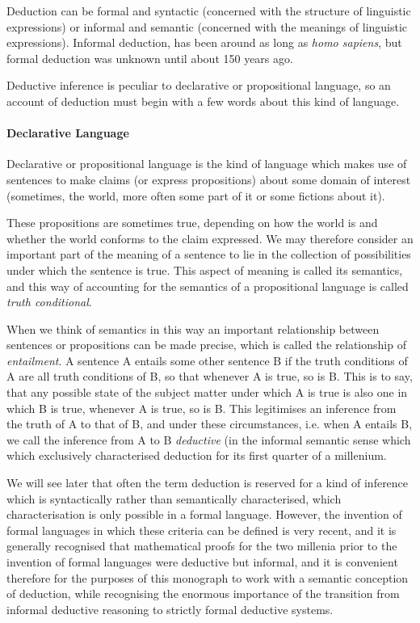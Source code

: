 \documentclass[10pt,titlepage]{book}
\begin{document}
Deduction can be formal and syntactic (concerned with the structure of linguistic expressions)  or informal and semantic (concerned with the meanings of linguistic expressions).
Informal deduction, has been around as long as \emph{homo sapiens}, but formal deduction was unknown until about 150 years ago.

Deductive inference is peculiar to declarative or propositional language, so an account of deduction must begin with a few words about this kind of language.

\paragraph{Declarative Language}

Declarative or propositional language is the kind of language which makes use of sentences to make claims (or express propositions) about some domain of interest (sometimes, the world, more often some part of it or some fictions about it).

These propositions are sometimes true, depending on how the world is and whether the world conforms to the claim expressed.
We may therefore consider an important part of the meaning of a sentence to lie in the collection of possibilities under which the sentence is true.
This aspect of meaning is called its semantics, and this way of accounting for the semantics of a propositional language is called \emph{truth conditional}.

When we think of semantics in this way an important relationship between sentences or propositions can be made precise, which is called the relationship of \emph{entailment}.
A sentence A entails some other sentence B if the truth conditions of A are all truth conditions of B, so that whenever A is true, so is B.
This is to say, that any possible state of the subject matter under which A is true is also one in which B is true, whenever A is true, so is B.
This legitimises an inference from the truth of A to that of B, and under these circumstances, i.e. when A entails B, we call the inference from A to B \emph{deductive} (in the informal semantic sense which which exclusively characterised deduction for its first quarter of a millenium.

We will see later that often the term deduction is reserved for a kind of inference which is syntactically rather than semantically characterised, which characterisation is only possible in a formal language.
However, the invention of formal languages in which these criteria can be defined is very recent, and it is generally recognised that mathematical proofs for the two millenia prior to the invention of formal languages were deductive but informal, and it is convenient therefore for the purposes of this monograph to work with a semantic conception of deduction, while recognising the enormous importance of the transition from informal deductive reasoning to strictly formal deductive systems.
\end{document}
